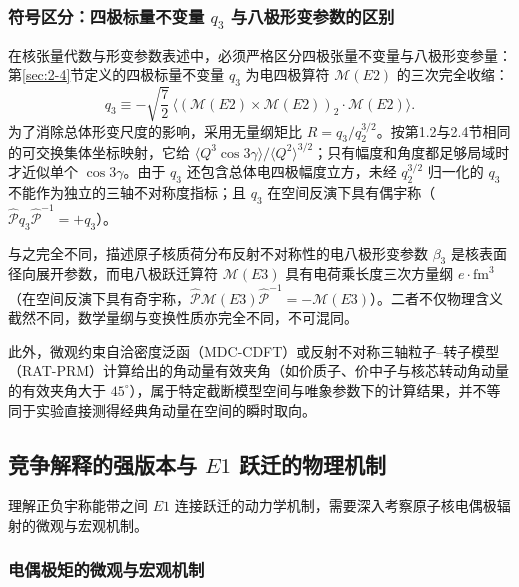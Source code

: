 \subsubsection{符号区分：四极标量不变量 $q_3$ 与八极形变参数的区别}

在核张量代数与形变参数表述中，必须严格区分四极张量不变量与八极形变参量：
第\ref{sec:2-4}节定义的四极标量不变量 $q_3$ 为电四极算符 $\mathcal{M}(E2)$ 的三次完全收缩：
\begin{equation}\label{eq:4-5-q3-def}
q_3 \equiv -\sqrt{\frac{7}{2}}\,\langle (\mathcal{M}(E2) \times \mathcal{M}(E2))_2 \cdot \mathcal{M}(E2) \rangle .
\end{equation}
为了消除总体形变尺度的影响，采用无量纲矩比 $R=q_3/q_2^{3/2}$。按第1.2与2.4节相同的可交换集体坐标映射，它给 $\langle Q^3\cos3\gamma\rangle/\langle Q^2\rangle^{3/2}$；只有幅度和角度都足够局域时才近似单个 $\cos3\gamma$。由于 $q_3$ 还包含总体电四极幅度立方，未经 $q_2^{3/2}$ 归一化的 $q_3$ 不能作为独立的三轴不对称度指标；且 $q_3$ 在空间反演下具有偶宇称（$\hat{\mathcal{P}} q_3 \hat{\mathcal{P}}^{-1} = +q_3$）。

与之完全不同，描述原子核质荷分布反射不对称性的电八极形变参数 $\beta_3$ 是核表面径向展开参数，而电八极跃迁算符 $\mathcal{M}(E3)$ 具有电荷乘长度三次方量纲 $e\cdot\mathrm{fm}^3$（在空间反演下具有奇宇称，$\hat{\mathcal{P}} \mathcal{M}(E3) \hat{\mathcal{P}}^{-1} = -\mathcal{M}(E3)$）。二者不仅物理含义截然不同，数学量纲与变换性质亦完全不同，不可混同。

此外，微观约束自洽密度泛函（MDC-CDFT）或反射不对称三轴粒子--转子模型（RAT-PRM）计算给出的角动量有效夹角（如价质子、价中子与核芯转动角动量的有效夹角大于 $45^\circ$），属于特定截断模型空间与唯象参数下的计算结果，并不等同于实验直接测得经典角动量在空间的瞬时取向。

\subsection{竞争解释的强版本与 $E1$ 跃迁的物理机制}\label{sec:4-5-4}

理解正负宇称能带之间 $E1$ 连接跃迁的动力学机制，需要深入考察原子核电偶极辐射的微观与宏观机制。

\subsubsection{电偶极矩的微观与宏观机制}

